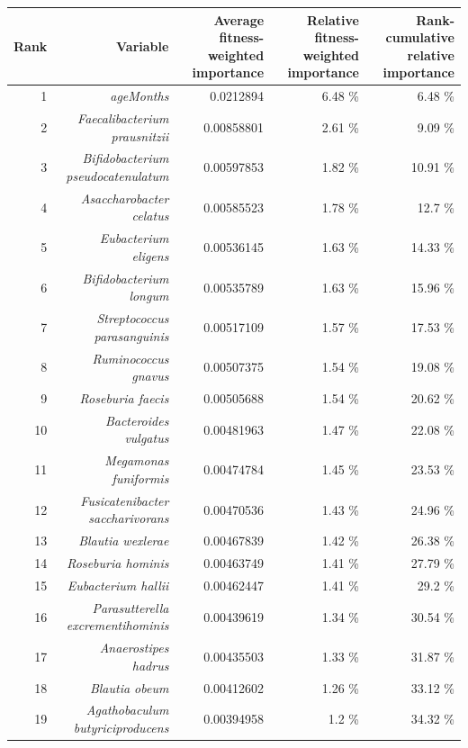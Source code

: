 \documentclass{article}
\begin{document}
\begin{table}[h]
  \begin{centering}
    \tiny
    \begin{tabular}{|r|r|r|r|r|}
      \hline\hline
      \textbf{Rank} & \textbf{Variable} & \textbf{Average fitness-weighted importance} & \textbf{Relative fitness-weighted importance} & \textbf{Rank-cumulative relative importance } \\\hline
      1 & \textit{ageMonths} & 0.0212894 & 6.48 \% & 6.48 \% \\
      2 & \textit{Faecalibacterium prausnitzii} & 0.00858801 & 2.61 \% & 9.09 \% \\
      3 & \textit{Bifidobacterium pseudocatenulatum} & 0.00597853 & 1.82 \% & 10.91 \% \\
      4 & \textit{Asaccharobacter celatus} & 0.00585523 & 1.78 \% & 12.7 \% \\
      5 & \textit{Eubacterium eligens} & 0.00536145 & 1.63 \% & 14.33 \% \\
      6 & \textit{Bifidobacterium longum} & 0.00535789 & 1.63 \% & 15.96 \% \\
      7 & \textit{Streptococcus parasanguinis} & 0.00517109 & 1.57 \% & 17.53 \% \\
      8 & \textit{Ruminococcus gnavus} & 0.00507375 & 1.54 \% & 19.08 \% \\
      9 & \textit{Roseburia faecis} & 0.00505688 & 1.54 \% & 20.62 \% \\
      10 & \textit{Bacteroides vulgatus} & 0.00481963 & 1.47 \% & 22.08 \% \\
      11 & \textit{Megamonas funiformis} & 0.00474784 & 1.45 \% & 23.53 \% \\
      12 & \textit{Fusicatenibacter saccharivorans} & 0.00470536 & 1.43 \% & 24.96 \% \\
      13 & \textit{Blautia wexlerae} & 0.00467839 & 1.42 \% & 26.38 \% \\
      14 & \textit{Roseburia hominis} & 0.00463749 & 1.41 \% & 27.79 \% \\
      15 & \textit{Eubacterium hallii} & 0.00462447 & 1.41 \% & 29.2 \% \\
      16 & \textit{Parasutterella excrementihominis} & 0.00439619 & 1.34 \% & 30.54 \% \\
      17 & \textit{Anaerostipes hadrus} & 0.00435503 & 1.33 \% & 31.87 \% \\
      18 & \textit{Blautia obeum} & 0.00412602 & 1.26 \% & 33.12 \% \\
      19 & \textit{Agathobaculum butyriciproducens} & 0.00394958 & 1.2 \% & 34.32 \% \\

\end{tabular}
\end{centering}
\end{table}
\end{document}
